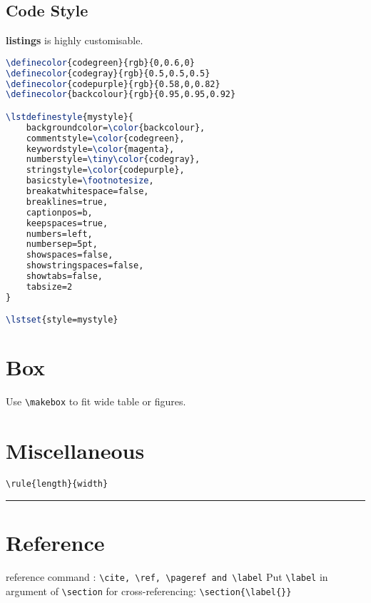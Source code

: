 \subsection{Code Style}
\textbf{listings} is highly customisable.  
\begin{lstlisting}[language=TeX]
\definecolor{codegreen}{rgb}{0,0.6,0}
\definecolor{codegray}{rgb}{0.5,0.5,0.5}
\definecolor{codepurple}{rgb}{0.58,0,0.82}
\definecolor{backcolour}{rgb}{0.95,0.95,0.92}

\lstdefinestyle{mystyle}{
    backgroundcolor=\color{backcolour},   
    commentstyle=\color{codegreen},
    keywordstyle=\color{magenta},
    numberstyle=\tiny\color{codegray},
    stringstyle=\color{codepurple},
    basicstyle=\footnotesize,
    breakatwhitespace=false,         
    breaklines=true,                 
    captionpos=b,                    
    keepspaces=true,                 
    numbers=left,                    
    numbersep=5pt,                  
    showspaces=false,                
    showstringspaces=false,
    showtabs=false,                  
    tabsize=2
}

\lstset{style=mystyle}
\end{lstlisting}

\section{Box}
Use \verb|\makebox| to fit wide table or figures.

\section{Miscellaneous}
\verb|\rule{length}{width}|

{\color{red}	\rule{\linewidth}{0.5mm} }
\section{Reference}
reference command :
\verb|\cite, \ref, \pageref and \label|
Put \verb|\label| in argument of \verb|\section| for cross-referencing:
\verb|\section{\label{}}|


